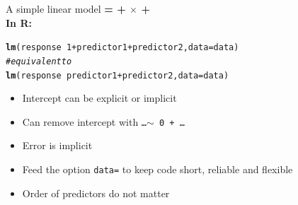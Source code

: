 \documentclass[10pt]{beamer}\usepackage[]{graphicx}\usepackage[]{color}
\makeatletter
\newcommand{\hlnum}[1]{\textcolor[rgb]{0.686,0.059,0.569}{#1}}%
\newcommand{\hlcom}[1]{\textcolor[rgb]{0.678,0.584,0.686}{\textit{#1}}}%
\newcommand{\hlopt}[1]{\textcolor[rgb]{0,0,0}{#1}}%
\newcommand{\hlstd}[1]{\textcolor[rgb]{0.345,0.345,0.345}{#1}}%
\newcommand{\hlkwc}[1]{\textcolor[rgb]{0.333,0.667,0.333}{#1}}%
\newcommand{\hlkwd}[1]{\textcolor[rgb]{0.737,0.353,0.396}{\textbf{#1}}}%
\newenvironment{kframe}{%
 \def\at@end@of@kframe{}%
 \ifinner\ifhmode%
  \def\at@end@of@kframe{\end{minipage}}%
  \begin{minipage}{\columnwidth}%
 \fi\fi%
 \def\FrameCommand##1{\hskip\@totalleftmargin \hskip-\fboxsep
 \colorbox{shadecolor}{##1}\hskip-\fboxsep
     \hskip-\linewidth \hskip-\@totalleftmargin \hskip\columnwidth}%
 \MakeFramed {\advance\hsize-\width
   \@totalleftmargin\z@ \linewidth\hsize
   \@setminipage}}%
 {\par\unskip\endMakeFramed%
 \at@end@of@kframe}
\newenvironment{knitrout}{}{} %
\makeatother
\begin{document}
\begin{frame}[fragile]{A simple linear model}
  \textbf{{\color{purple}{Response}} = {\color{blue}{Intercept}} + {\color{red}{Slope}} $\times$ {\color{orange}{Predictor}} + {\color{gray}{Error}}} \\
  \vspace{1cm}
\textbf{In R:}
\begin{knitrout}
\color{fgcolor}\begin{kframe}
\begin{alltt}
  \hlkwd{lm}\hlstd{(response} \hlopt{~} \hlnum{1} \hlopt{+} \hlstd{predictor1} \hlopt{+} \hlstd{predictor2,} \hlkwc{data}\hlstd{=data)}
    \hlcom{# equivalent to}
  \hlkwd{lm}\hlstd{(response} \hlopt{~} \hlstd{predictor1} \hlopt{+} \hlstd{predictor2,} \hlkwc{data}\hlstd{=data)}
\end{alltt}
\end{kframe}
\end{knitrout}
\begin{itemize}
  \item Intercept can be explicit or implicit
  \item Can remove intercept with \texttt{\dots $\sim $ 0 + \dots}
  \item Error is implicit
  \item Feed the option \texttt{data=} to keep code short, reliable and flexible
  \item Order of predictors do not matter 
\end{itemize}

\end{frame}
\end{document}
